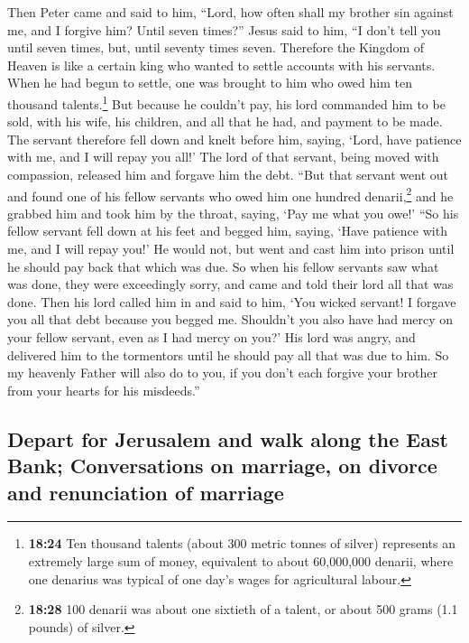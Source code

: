  Then Peter came and said to him, ``Lord, how often shall
my brother sin against me, and I forgive him? Until seven times?''
 Jesus said to him, ``I don't tell you until seven times,
but, until seventy times seven.  Therefore the Kingdom of
Heaven is like a certain king who wanted to settle accounts with his
servants.  When he had begun to settle, one was brought
to him who owed him ten thousand talents.\footnote{\textbf{18:24} Ten
  thousand talents (about 300 metric tonnes of silver) represents an
  extremely large sum of money, equivalent to about 60,000,000 denarii,
  where one denarius was typical of one day's wages for agricultural
  labour.}  But because he couldn't pay, his lord
commanded him to be sold, with his wife, his children, and all that he
had, and payment to be made.  The servant therefore fell
down and knelt before him, saying, `Lord, have patience with me, and I
will repay you all!'  The lord of that servant, being
moved with compassion, released him and forgave him the debt.
 ``But that servant went out and found one of his fellow
servants who owed him one hundred denarii,\footnote{\textbf{18:28} 100
  denarii was about one sixtieth of a talent, or about 500 grams (1.1
  pounds) of silver.} and he grabbed him and took him by the throat,
saying, `Pay me what you owe!'  ``So his fellow servant
fell down at his feet and begged him, saying, `Have patience with me,
and I will repay you!'  He would not, but went and cast
him into prison until he should pay back that which was due.
 So when his fellow servants saw what was done, they were
exceedingly sorry, and came and told their lord all that was done.
 Then his lord called him in and said to him, `You wicked
servant! I forgave you all that debt because you begged me.
 Shouldn't you also have had mercy on your fellow
servant, even as I had mercy on you?'  His lord was
angry, and delivered him to the tormentors until he should pay all that
was due to him.  So my heavenly Father will also do to
you, if you don't each forgive your brother from your hearts for his
misdeeds.''

\hypertarget{depart-for-jerusalem-and-walk-along-the-east-bank-conversations-on-marriage-on-divorce-and-renunciation-of-marriage}{%
\subsection{Depart for Jerusalem and walk along the East Bank;
Conversations on marriage, on divorce and renunciation of
marriage}\label{depart-for-jerusalem-and-walk-along-the-east-bank-conversations-on-marriage-on-divorce-and-renunciation-of-marriage}}

